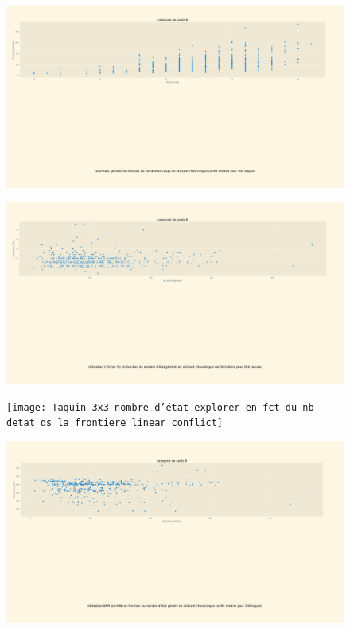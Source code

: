 \documentclass[a4paper, 12pt]{article}
\begin{document}
\begin{figure}[H]
    \centering
    \includegraphics[width=\textwidth]{Taquin 3x3 nombre d'etats generer en fct du nb de coups linear conflict}
\end{figure}
\begin{figure}[H]
    \centering
    \includegraphics[width=\textwidth]{Taquin 3x3 utilisation CPU en fct du nb d'etat generer linear conflict}
\end{figure}
\begin{figure}[H]
    \centering
    \texttt{[image: Taquin 3x3 nombre d'état explorer en fct du nb detat ds la frontiere linear conflict]}
\end{figure}

\begin{figure}[H]
    \centering
    \includegraphics[width=\textwidth]{Taquin 3x3 utilisation RAM en fct du nb d'etat generer conlit lineaire}
\end{figure}
\end{document}
